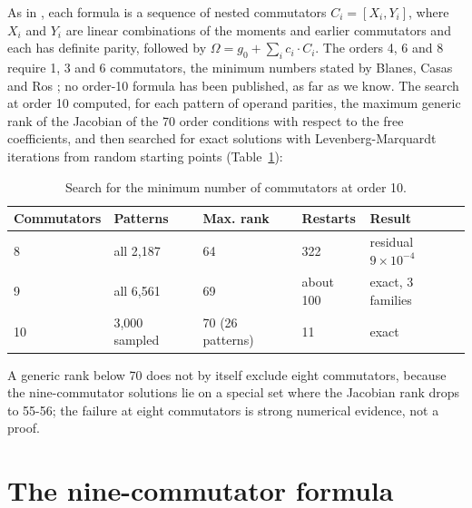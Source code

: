 \documentclass[12pt]{article}
\begin{document}
As in \cite{j28}, each formula is a sequence of nested commutators $C_i=[X_i,Y_i]$, where $X_i$ and $Y_i$ are linear combinations of the moments and earlier commutators and each has definite parity, followed by $\Omega=g_0+\sum_i c_i\cdot C_i$. The orders 4, 6 and 8 require 1, 3 and 6 commutators, the minimum numbers stated by Blanes, Casas and Ros \cite{bcr2002}; no order-10 formula has been published, as far as we know. The search at order 10 computed, for each pattern of operand parities, the maximum generic rank of the Jacobian of the 70 order conditions with respect to the free coefficients, and then searched for exact solutions with Levenberg-Marquardt iterations from random starting points (Table~\ref{tab:search}):

\begin{table}[H]
\centering\small
\caption{Search for the minimum number of commutators at order 10.}\label{tab:search}
\begin{tabular}{lllll}
\hline
Commutators & Patterns & Max. rank & Restarts & Result \\ \hline
8 & all 2,187 & 64 & 322 & residual $9\times10^{-4}$ \\
9 & all 6,561 & 69 & about 100 & exact, 3 families \\
10 & 3,000 sampled & 70 (26 patterns) & 11 & exact \\ \hline
\end{tabular}
\end{table}

\noindent A generic rank below 70 does not by itself exclude eight commutators, because the nine-commutator solutions lie on a special set where the Jacobian rank drops to 55-56; the failure at eight commutators is strong numerical evidence, not a proof.

\section*{The nine-commutator formula}
\end{document}
